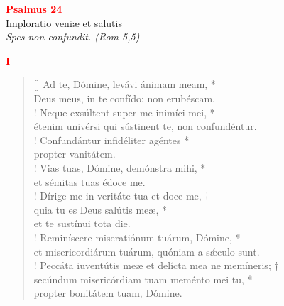 


\def\greinitialformat#1{%
{\fontsize{39}{39}\selectfont #1}%
}




\vspace{0.3cm}
\begin{center}
 \textcolor{red}{\large \bf Psalmus 24}\\
Imploratio veniæ et salutis\\
\textit{\small Spes non confundit. (Rom 5,5)}
\end{center}
\begin{center}
\textcolor{red}{\bf I}
\end{center}
\begin{verse}[\versewidth]
Ad te, Dómine, levávi ánimam meam, *\\
Deus meus, in te confído: non erubéscam.\\!
\vin Neque exsúltent super me inimíci mei, *\\
\vin étenim univérsi qui sústinent te, non confundéntur.\\!
Confundántur infidéliter agéntes *\\
propter vanitátem.\\!
\vin Vias tuas, Dómine, demónstra mihi, *\\
\vin et sémitas tuas édoce me.\\!
Dírige me in veritáte tua et doce me, †\\
quia tu es Deus salútis meæ, *\\
et te sustínui tota die.\\!
\vin Reminíscere miseratiónum tuárum, Dómine, *\\
\vin et misericordiárum tuárum, quóniam a s\'{æ}culo sunt.\\!
Peccáta iuventútis meæ et delícta mea ne memíneris; †\\
secúndum misericórdiam tuam meménto mei tu, *\\
propter bonitátem tuam, Dómine.\\
\end{verse}
